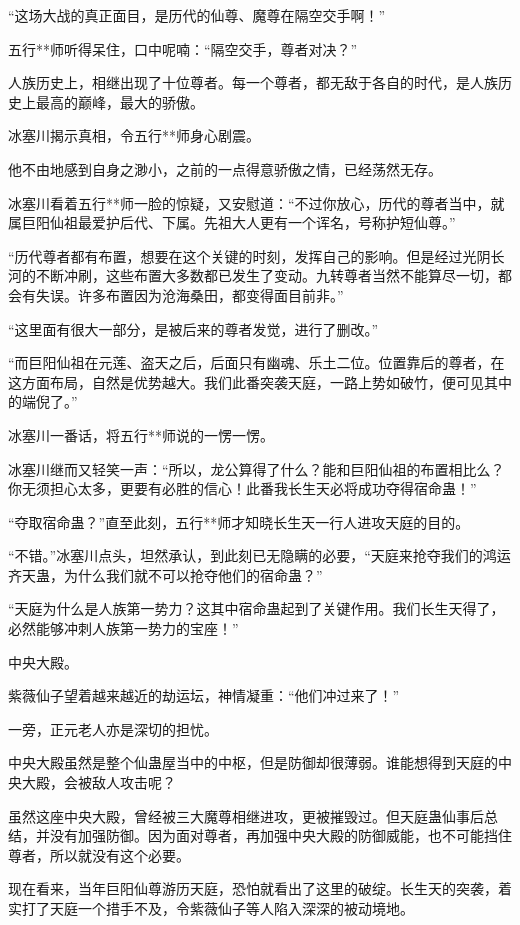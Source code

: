 \begin{this_body}
“这场大战的真正面目，是历代的仙尊、魔尊在隔空交手啊！”

五行**师听得呆住，口中呢喃：“隔空交手，尊者对决？”

人族历史上，相继出现了十位尊者。每一个尊者，都无敌于各自的时代，是人族历史上最高的巅峰，最大的骄傲。

冰塞川揭示真相，令五行**师身心剧震。

他不由地感到自身之渺小，之前的一点得意骄傲之情，已经荡然无存。

冰塞川看着五行**师一脸的惊疑，又安慰道：“不过你放心，历代的尊者当中，就属巨阳仙祖最爱护后代、下属。先祖大人更有一个诨名，号称护短仙尊。”

“历代尊者都有布置，想要在这个关键的时刻，发挥自己的影响。但是经过光阴长河的不断冲刷，这些布置大多数都已发生了变动。九转尊者当然不能算尽一切，都会有失误。许多布置因为沧海桑田，都变得面目前非。”

“这里面有很大一部分，是被后来的尊者发觉，进行了删改。”

“而巨阳仙祖在元莲、盗天之后，后面只有幽魂、乐土二位。位置靠后的尊者，在这方面布局，自然是优势越大。我们此番突袭天庭，一路上势如破竹，便可见其中的端倪了。”

冰塞川一番话，将五行**师说的一愣一愣。

冰塞川继而又轻笑一声：“所以，龙公算得了什么？能和巨阳仙祖的布置相比么？你无须担心太多，更要有必胜的信心！此番我长生天必将成功夺得宿命蛊！”

“夺取宿命蛊？”直至此刻，五行**师才知晓长生天一行人进攻天庭的目的。

“不错。”冰塞川点头，坦然承认，到此刻已无隐瞒的必要，“天庭来抢夺我们的鸿运齐天蛊，为什么我们就不可以抢夺他们的宿命蛊？”

“天庭为什么是人族第一势力？这其中宿命蛊起到了关键作用。我们长生天得了，必然能够冲刺人族第一势力的宝座！”

中央大殿。

紫薇仙子望着越来越近的劫运坛，神情凝重：“他们冲过来了！”

一旁，正元老人亦是深切的担忧。

中央大殿虽然是整个仙蛊屋当中的中枢，但是防御却很薄弱。谁能想得到天庭的中央大殿，会被敌人攻击呢？

虽然这座中央大殿，曾经被三大魔尊相继进攻，更被摧毁过。但天庭蛊仙事后总结，并没有加强防御。因为面对尊者，再加强中央大殿的防御威能，也不可能挡住尊者，所以就没有这个必要。

现在看来，当年巨阳仙尊游历天庭，恐怕就看出了这里的破绽。长生天的突袭，着实打了天庭一个措手不及，令紫薇仙子等人陷入深深的被动境地。


\end{this_body}
